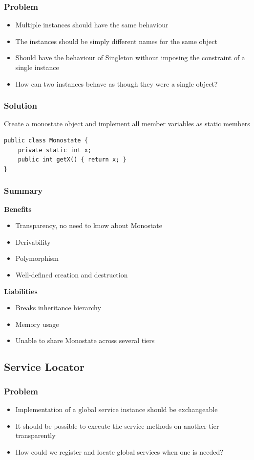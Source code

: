 \subsubsection{Problem}
\begin{itemize}
    \item Multiple instances should have the same behaviour
    \item The instances should be simply different names for the same object 
    \item Should have the behaviour of Singleton without imposing the constraint of a single instance
    \item How can two instances behave as though they were a single object?
\end{itemize}
\subsubsection{Solution}
Create a monostate object and implement all member variables as static members 
\begin{lstlisting}
public class Monostate {
    private static int x;
    public int getX() { return x; }
}
\end{lstlisting}
\subsubsection{Summary}
\textbf{Benefits}
\begin{itemize}
    \item Transparency, no need to know about Monostate
    \item Derivability
    \item Polymorphism
    \item Well-defined creation and destruction
\end{itemize}
\textbf{Liabilities}
\begin{itemize}
    \item Breaks inheritance hierarchy
    \item Memory usage
    \item Unable to share Monostate across several tiers
\end{itemize}

\subsection{Service Locator}
\subsubsection{Problem}
\begin{itemize}
    \item Implementation of a global service instance should be exchangeable
    \item It should be possible to execute the service methods on another tier transparently
    \item How could we register and locate global services when one is needed?
\end{itemize}
